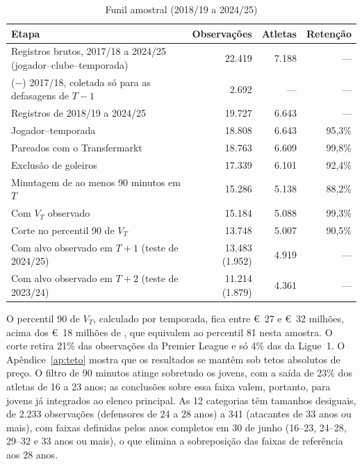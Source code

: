 \documentclass[article, 12pt, oneside, a4paper, english, brazil, section=TITLE]{abntex2}
\begin{document}
\begin{table}[htbp]
  \caption{Funil amostral (2018/19 a 2024/25)}
  \label{tab:funil}
  \begin{tabularx}{\textwidth}{Lrrr}
    \toprule
    Etapa & Observações & Atletas & Retenção \\
    \midrule
    Registros brutos, 2017/18 a 2024/25 (jogador–clube–temporada) & 22.419 & 7.188 & — \\
    (−) 2017/18, coletada só para as defasagens de $T-1$ & 2.692 & — & — \\
    Registros de 2018/19 a 2024/25 & 19.727 & 6.643 & — \\
    Jogador–temporada & 18.808 & 6.643 & 95,3\% \\
    Pareados com o Transfermarkt & 18.763 & 6.609 & 99,8\% \\
    Exclusão de goleiros & 17.339 & 6.101 & 92,4\% \\
    Minutagem de ao menos 90 minutos em $T$ & 15.286 & 5.138 & 88,2\% \\
    Com $V_T$ observado & 15.184 & 5.088 & 99,3\% \\
    Corte no percentil 90 de $V_T$ & 13.748 & 5.007 & 90,5\% \\
    \midrule
    Com alvo observado em $T+1$ (teste de 2024/25) & 13.483 (1.952) & 4.919 & — \\
    Com alvo observado em $T+2$ (teste de 2023/24) & 11.214 (1.879) & 4.361 & — \\
    \bottomrule
  \end{tabularx}
\end{table}

O percentil 90 de $V_T$, calculado por temporada, fica entre €~27 e €~32 milhões, acima dos €~18 milhões de \textcite{muller2017}, que equivalem ao percentil 81 nesta amostra.
O corte retira 21\% das observações da Premier League e só 4\% das da Ligue~1.
O Apêndice~\ref{ap:teto} mostra que os resultados se mantêm sob tetos absolutos de preço.
O filtro de 90 minutos atinge sobretudo os jovens, com a saída de 23\% dos atletas de 16 a 23 anos; as conclusões sobre essa faixa valem, portanto, para jovens já integrados ao elenco principal.
As 12 categorias têm tamanhos desiguais, de 2.233 observações (defensores de 24 a 28 anos) a 341 (atacantes de 33 anos ou mais), com faixas definidas pelos anos completos em 30 de junho (16–23, 24–28, 29–32 e 33 anos ou mais), o que elimina a sobreposição das faixas de referência aos 28 anos.
\end{document}
